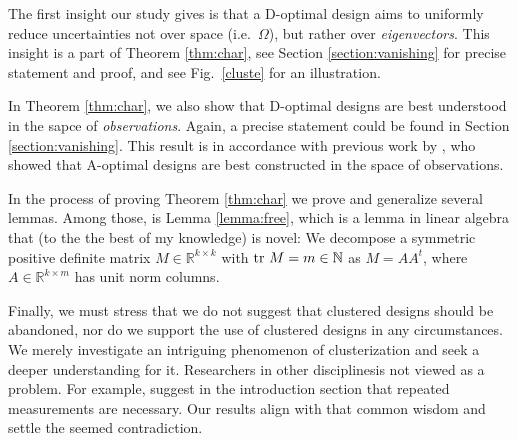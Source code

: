 \begin{enumerate}




\end{enumerate}

The first insight our study gives is that a D-optimal design aims to
uniformly reduce uncertainties not over space (i.e.~$\Omega$), but
rather over \emph{eigenvectors}. This insight is a part of Theorem
\ref{thm:char}, see Section \ref{section:vanishing} for precise
statement and proof, and see Fig.~\ref{cluste} for an illustration.

In Theorem \ref{thm:char}, we also show that D-optimal designs are
best understood in the sapce of \emph{observations}. Again, a precise
statement could be found in Section \ref{section:vanishing}.  This
result is in accordance with previous work by \cite{koval2020}, who
showed that A-optimal designs are best constructed in the space of
observations.

In the process of proving Theorem \ref{thm:char} we prove and
generalize several lemmas. Among those, is Lemma \ref{lemma:free},
which is a lemma in linear algebra that (to the the best of my
knowledge) is novel: We decompose a symmetric positive definite matrix
\(M \in \mathbb{R}^{k \times k}\) with \(\textup{tr}\ M = m \in \mathbb{N}\)
as \(M = AA^t\), where \(A\in \mathbb{R}^{k \times m}\) has unit norm
columns.


Finally, we must stress that we do not suggest that clustered designs
should be abandoned, nor do we support the use of clustered designs in
any circumstances. We merely investigate an intriguing phenomenon of
clusterization and seek a deeper understanding for it. Researchers in
other disciplinesis not viewed as a problem. For example, \cite{lozan}
suggest in the introduction section that repeated measurements are
necessary. Our results align with that common wisdom and settle the
seemed contradiction.


